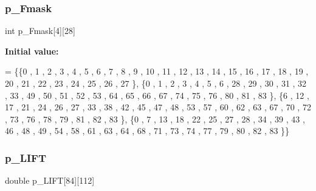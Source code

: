 \mbox{\label{a00494_ab30e3bffa73b672b31748c5267d04f6c}} 
\subsubsection{\texorpdfstring{p\+\_\+\+Fmask}{p\_Fmask}}
{\footnotesize\ttfamily int p\+\_\+\+Fmask\mbox{[}4\mbox{]}\mbox{[}28\mbox{]}}

{\bfseries Initial value\+:}
\begin{DoxyCode}
= \{\{0 , 1 , 2 , 3 , 4 , 5 , 6 , 7 , 8 , 9 , 10 , 11 , 12 , 13 , 14 , 15 , 16 , 17 , 18 , 19 , 20 , 21 , 22 
      , 23 , 24 , 25 , 26 , 27 \},
\{0 , 1 , 2 , 3 , 4 , 5 , 6 , 28 , 29 , 30 , 31 , 32 , 33 , 49 , 50 , 51 , 52 , 53 , 64 , 65 , 66 , 67 , 74 
      , 75 , 76 , 80 , 81 , 83 \},
\{6 , 12 , 17 , 21 , 24 , 26 , 27 , 33 , 38 , 42 , 45 , 47 , 48 , 53 , 57 , 60 , 62 , 63 , 67 , 70 , 72 , 73
       , 76 , 78 , 79 , 81 , 82 , 83 \},
\{0 , 7 , 13 , 18 , 22 , 25 , 27 , 28 , 34 , 39 , 43 , 46 , 48 , 49 , 54 , 58 , 61 , 63 , 64 , 68 , 71 , 73 
      , 74 , 77 , 79 , 80 , 82 , 83 \}\}
\end{DoxyCode}
\mbox{\label{a00494_a432c0a87f7f3f25d8b292fc3b5a76562}} 
\subsubsection{\texorpdfstring{p\+\_\+\+L\+I\+FT}{p\_LIFT}}
{\footnotesize\ttfamily double p\+\_\+\+L\+I\+FT\mbox{[}84\mbox{]}\mbox{[}112\mbox{]}}

\mbox{\label{a00494_ab372d3fca8d11fbb1eed2f12a4302ba1}} 
